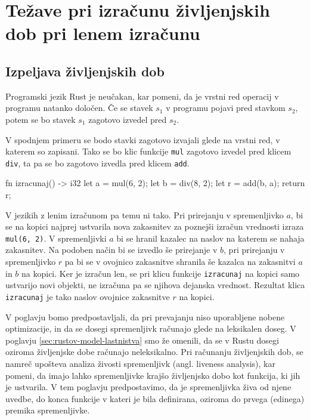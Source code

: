 \chapter[Življenjske dobe in leni izračun]{Težave pri izračunu življenjskih dob pri lenem izračunu}

\section{Izpeljava življenjskih dob}

Programski jezik Rust je neučakan, kar pomeni, da je vrstni red operacij v programu natanko določen. Če se stavek $s_1$ v programu pojavi pred stavkom $s_2$, potem se bo stavek $s_1$ zagotovo izvedel pred $s_2$.

V spodnjem primeru se bodo stavki zagotovo izvajali glede na vrstni red, v katerem so zapisani. Tako se bo klic funkcije \texttt{mul} zagotovo izvedel pred klicem \texttt{div}, ta pa se bo zagotovo izvedla pred klicem \texttt{add}.

\begin{rust-success}
fn izracunaj() -> i32 {
    let a = mul(6, 2);
    let b = div(8, 2);
    let r = add(b, a);
    return r;
}
\end{rust-success}

V jezikih z lenim izračunom pa temu ni tako. Pri prirejanju v spremenljivko $a$, bi se na kopici najprej ustvarila nova zakasnitev za poznejši izračun vrednosti izraza \texttt{mul(6, 2)}. V spremenljivki $a$ bi se hranil kazalec na naslov na katerem se nahaja zakasnitev. Na podoben način bi se izvedlo še prirejanje v $b$, pri prirejanju v spremenljivko $r$ pa bi se v ovojnico zakasnitve shranila še kazalca na zakasnitvi $a$ in $b$ na kopici. Ker je izračun len, se pri klicu funkcije \texttt{izracunaj} na kopici samo ustvarijo novi objekti, ne izračuna pa se njihova dejanska vrednost. Rezultat klica \texttt{izracunaj} je tako naslov ovojnice zakasnitve $r$ na kopici. 

V poglavju bomo predpostavljali, da pri prevajanju niso uporabljene nobene optimizacije, in da se dosegi spremenljivk računajo glede na leksikalen doseg. V poglavju \ref{sec:rustov-model-lastnistva} smo že omenili, da se v Rustu dosegi oziroma življenjske dobe računajo neleksikalno. Pri računanju življenjskih dob, se namreč upošteva analiza živosti spremenljivk (angl. liveness analysis), kar pomeni, da imajo lahko spremenljivke krajšo življenjsko dobo kot funkcija, ki jih je ustvarila. V tem poglavju predpostavimo, da je spremenljivka živa od njene uvedbe, do konca funkcije v kateri je bila definirana, oziroma do prvega (edinega) premika spremenljivke.

